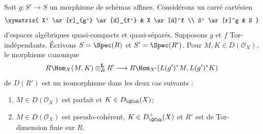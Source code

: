 \begin{lemma}
\label{lemma-affine-morphism-and-hom-out-of-perfect}
Soit $g:S'\to S$ un morphisme de sch\'emas affines. Consid\'erons un carr\'e
cart\'esien
$$
\xymatrix{
X' \ar[r]_{g'} \ar[d]_{f'} & X \ar[d]^f \\
S' \ar[r]^g & S
}
$$
d'espaces alg\'ebriques quasi-compacts et quasi-s\'epar\'es. Supposons $g$ et
$f$ Tor-ind\'ependants. \'Ecrivons $S=\Spec(R)$ et $S'=\Spec(R')$. Pour
$M,K\in D(\mathcal{O}_X)$, le morphisme canonique
$$
R\Hom_X(M, K) \otimes^\mathbf{L}_R R'
\longrightarrow
R\Hom_{X'}(L(g')^*M, L(g')^*K)
$$
de $D(R')$ est un isomorphisme dans les deux cas suivants :
\begin{enumerate}
\item $M\in D(\mathcal{O}_X)$ est parfait et $K\in D_\QCoh(X)$;
\item $M\in D(\mathcal{O}_X)$ est pseudo-coh\'erent,
$K\in D_\QCoh^+(X)$ et $R'$ est de Tor-dimension finie sur $R$.
\end{enumerate}
\end{lemma}

